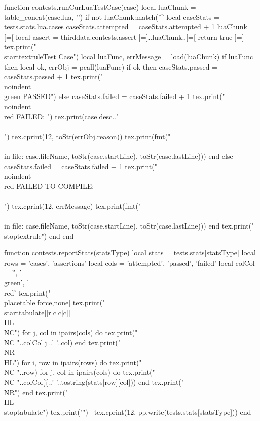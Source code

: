 function contests.runCurLuaTestCase(case)
  local luaChunk = table_concat(case.lua, '\n')
  if not luaChunk:match('^%
    local caseStats = tests.stats.lua.cases
    caseStats.attempted = caseStats.attempted + 1  
    luaChunk = [=[
    local assert = thirddata.contests.assert
    ]=]..luaChunk..[=[
    return true
    ]=]
    tex.print("\\starttextrule{Test Case}")
    local luaFunc, errMessage = load(luaChunk)
    if luaFunc then
      local ok, errObj = pcall(luaFunc)
      if ok then
        caseStats.passed = caseStats.passed + 1
        tex.print("\\noindent{\\green PASSED}")
      else
        caseStats.failed = caseStats.failed + 1
        tex.print("\\noindent{\\red FAILED}: ")
        tex.print(case.desc.."\\\\")
        tex.cprint(12, toStr(errObj.reason))
        tex.print(fmt("\\\\ in file: %
          case.fileName, toStr(case.startLine), toStr(case.lastLine)))
      end
    else
      caseStats.failed = caseStats.failed + 1
      tex.print("\\noindent{\\red FAILED TO COMPILE}: \\\\")
      tex.cprint(12, errMessage)
      tex.print(fmt("\\\\ in file: %
        case.fileName, toStr(case.startLine), toStr(case.lastLine)))
    end
    tex.print("\\stoptextrule")
  end
end

function contests.reportStats(statsType)
  local stats = tests.stats[statsType]
  local rows = { 'cases', 'assertions' }
  local cols = { 'attempted', 'passed', 'failed' }
  local colCol = { '', '\\green', '\\red'}
  tex.print("\\placetable[force,none]{}{%
  tex.print("\\starttabulate[|r|c|c|c|]\\HL\\NC")
  for j, col in ipairs(cols) do
    tex.print("\\NC "..colCol[j]..' '..col)
  end
  tex.print("\\NR\\HL")
  for i, row in ipairs(rows) do
    tex.print("\\NC "..row)
    for j, col in ipairs(cols) do
      tex.print("\\NC "..colCol[j]..' '..tostring(stats[row][col]))
    end
    tex.print("\\NR")
  end
  tex.print("\\HL\\stoptabulate")
  tex.print("}")
  --tex.cprint(12, pp.write(tests.stats[statsType]))
end

